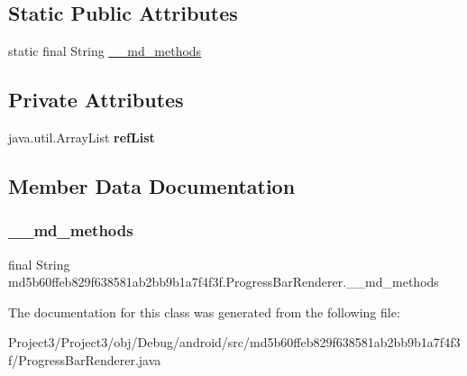 \subsection*{Static Public Attributes}
\begin{DoxyCompactItemize}
\item 
static final String \hyperlink{classmd5b60ffeb829f638581ab2bb9b1a7f4f3f_1_1ProgressBarRenderer_a81813d61865c0e1c93ba13fd369721ab}{\+\_\+\+\_\+md\+\_\+methods}
\end{DoxyCompactItemize}
\subsection*{Private Attributes}
\begin{DoxyCompactItemize}
\item 
\mbox{\label{classmd5b60ffeb829f638581ab2bb9b1a7f4f3f_1_1ProgressBarRenderer_ae911c6372b6bbc32229ca41ddcf09e5f}} 
java.\+util.\+Array\+List {\bfseries ref\+List}
\end{DoxyCompactItemize}


\subsection{Member Data Documentation}
\mbox{\label{classmd5b60ffeb829f638581ab2bb9b1a7f4f3f_1_1ProgressBarRenderer_a81813d61865c0e1c93ba13fd369721ab}} 
\subsubsection{\texorpdfstring{\+\_\+\+\_\+md\+\_\+methods}{\_\_md\_methods}}
{\footnotesize\ttfamily final String md5b60ffeb829f638581ab2bb9b1a7f4f3f.\+Progress\+Bar\+Renderer.\+\_\+\+\_\+md\+\_\+methods\hspace{0.3cm}{\ttfamily [static]}}



The documentation for this class was generated from the following file\+:\begin{DoxyCompactItemize}
\item 
Project3/\+Project3/obj/\+Debug/android/src/md5b60ffeb829f638581ab2bb9b1a7f4f3f/Progress\+Bar\+Renderer.\+java\end{DoxyCompactItemize}
